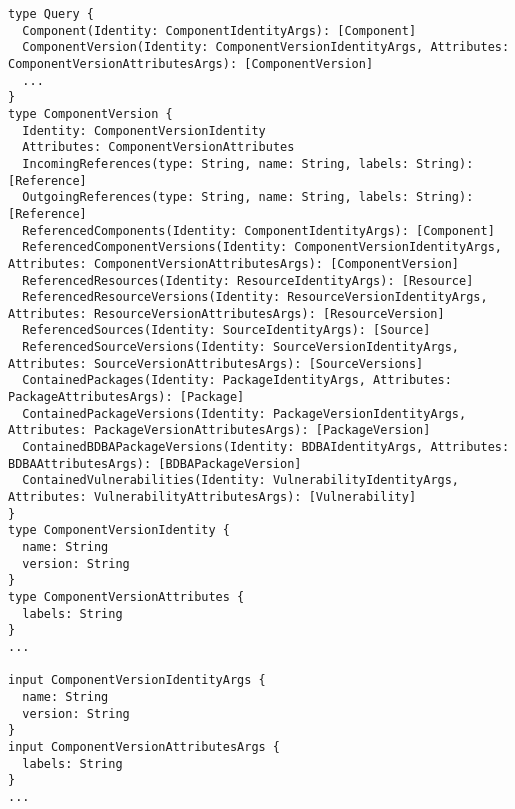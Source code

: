 \begin{lstlisting}[caption=GraphQL Component Version Schema, captionpos=b, label=lst:GraphQLComponentVersion]
type Query {
  Component(Identity: ComponentIdentityArgs): [Component]
  ComponentVersion(Identity: ComponentVersionIdentityArgs, Attributes: ComponentVersionAttributesArgs): [ComponentVersion]
  ...
}
type ComponentVersion {
  Identity: ComponentVersionIdentity
  Attributes: ComponentVersionAttributes
  IncomingReferences(type: String, name: String, labels: String): [Reference]
  OutgoingReferences(type: String, name: String, labels: String): [Reference]
  ReferencedComponents(Identity: ComponentIdentityArgs): [Component]
  ReferencedComponentVersions(Identity: ComponentVersionIdentityArgs, Attributes: ComponentVersionAttributesArgs): [ComponentVersion]
  ReferencedResources(Identity: ResourceIdentityArgs): [Resource]
  ReferencedResourceVersions(Identity: ResourceVersionIdentityArgs, Attributes: ResourceVersionAttributesArgs): [ResourceVersion]
  ReferencedSources(Identity: SourceIdentityArgs): [Source]
  ReferencedSourceVersions(Identity: SourceVersionIdentityArgs, Attributes: SourceVersionAttributesArgs): [SourceVersions]
  ContainedPackages(Identity: PackageIdentityArgs, Attributes: PackageAttributesArgs): [Package]
  ContainedPackageVersions(Identity: PackageVersionIdentityArgs, Attributes: PackageVersionAttributesArgs): [PackageVersion]
  ContainedBDBAPackageVersions(Identity: BDBAIdentityArgs, Attributes: BDBAAttributesArgs): [BDBAPackageVersion]
  ContainedVulnerabilities(Identity: VulnerabilityIdentityArgs, Attributes: VulnerabilityAttributesArgs): [Vulnerability]
}
type ComponentVersionIdentity {
  name: String
  version: String
}
type ComponentVersionAttributes {
  labels: String
}
...

input ComponentVersionIdentityArgs {
  name: String
  version: String
}
input ComponentVersionAttributesArgs {
  labels: String
}
...
\end{lstlisting}

